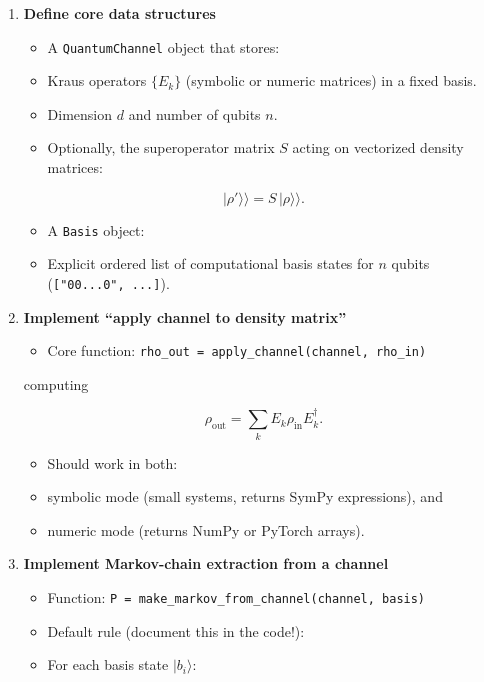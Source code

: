 \documentclass[11pt]{article}
\begin{document}
\begin{enumerate}
\item \textbf{Define core data structures}  
\begin{itemize}
\item A \texttt{QuantumChannel} object that stores:
\item Kraus operators $\{E_k\}$ (symbolic or numeric matrices) in a fixed basis.  
\item Dimension $d$ and number of qubits $n$.  
\item Optionally, the superoperator matrix $S$ acting on vectorized density matrices:
\end{itemize}
       
\begin{equation}
|\rho'\rangle\rangle = S \,|\rho\rangle\rangle.
\end{equation}

\begin{itemize}
\item A \texttt{Basis} object:
\item Explicit ordered list of computational basis states for $n$ qubits (\texttt{["00...0", ...]}).
\end{itemize}

\item \textbf{Implement ``apply channel to density matrix''}  
\begin{itemize}
\item Core function: \texttt{rho\_out = apply\_channel(channel, rho\_in)}  
\end{itemize}
       computing
       
\begin{equation}
\rho_{\text{out}} = \sum_k E_k \rho_{\text{in}} E_k^\dagger.
\end{equation}

\begin{itemize}
\item Should work in both:
\item symbolic mode (small systems, returns SymPy expressions), and  
\item numeric mode (returns NumPy or PyTorch arrays).
\end{itemize}

\item \textbf{Implement Markov-chain extraction from a channel}  
\begin{itemize}
\item Function: \texttt{P = make\_markov\_from\_channel(channel, basis)}  
\item Default rule (document this in the code!):
\item For each basis state $|b_i\rangle$:
\end{itemize}
       

\end{enumerate}
\end{document}
